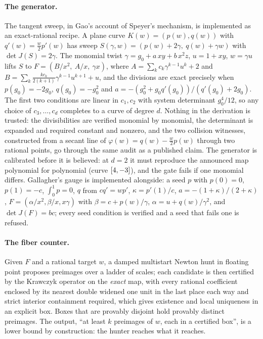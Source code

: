 \documentclass[11pt]{article}
\begin{document}
\paragraph{The generator.} The tangent sweep, in Gao's account \cite{Gao2026} of Speyer's
mechanism, is implemented as an exact-rational recipe. A plane curve $K(w)=(p(w),q(w))$ with
$q'(w)=\tfrac{w}{2}p'(w)$ has sweep $S(\gamma,w)=(p(w)+2\gamma,\ q(w)+\gamma w)$ with
$\det J(S)=2\gamma$. The monomial twist $\gamma=g_0+a\,xy+b\,x^2z$, $u=1+xy$, $w=\gamma u$
lifts $S$ to $F=(B/x^2,\ A/x,\ \gamma x)$, where $A=\sum_k c_k\gamma^{k-1}u^k+2$ and
$B=\sum_k\frac{kc_k}{2(k+1)}\gamma^{k-1}u^{k+1}+u$, and the divisions are exact precisely when
$p(g_0)=-2g_0$, $q(g_0)=-g_0^2$ and $a=-(g_0^2+g_0q'(g_0))/(q'(g_0)+2g_0)$. The first two
conditions are linear in $c_1,c_2$ with system determinant $g_0^4/12$, so any choice of
$c_3,\dots,c_d$ completes to a curve of degree $d$. Nothing in the derivation is trusted: the
divisibilities are verified monomial by monomial, the determinant is expanded and required
constant and nonzero, and the two collision witnesses, constructed from a secant line of
$\varphi(w)=q(w)-\tfrac{w}{2}p(w)$ through two rational points, go through the same audit as a
published claim. The generator is calibrated before it is believed: at $d=2$ it must reproduce
the announced map polynomial for polynomial (curve $[4, -3]$), and the gate fails if one
monomial differs. Gallagher's gauge is implemented alongside: a seed $p$ with $p(0)=0$,
$p(1)=-c$, $\int_0^1p=0$, $q$ from $cq'=wp'$, $\kappa=p'(1)/c$, $a=-(1+\kappa)/(2+\kappa)$,
$F=(\alpha/x^2,\beta/x,x\gamma)$ with $\beta=c+p(w)/\gamma$, $\alpha=u+q(w)/\gamma^2$, and
$\det J(F)=bc$; every seed condition is verified and a seed that fails one is refused.

\paragraph{The fiber counter.} Given $F$ and a rational target $w$, a damped multistart Newton
hunt in floating point proposes preimages over a ladder of scales; each candidate is then certified
by the Krawczyk operator \cite{Krawczyk1969} on the \emph{exact} map, with every rational
coefficient enclosed by its nearest double widened one unit in the last place each way and strict
interior containment required, which gives existence and local uniqueness in an explicit box.
Boxes that are provably disjoint hold provably distinct preimages. The output, ``at least $k$
preimages of $w$, each in a certified box'', is a lower bound by construction: the hunter reaches
what it reaches.
\end{document}
